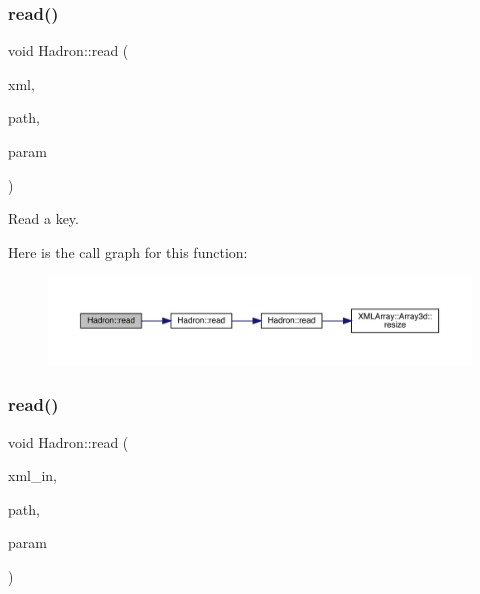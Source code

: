 \subsubsection{\texorpdfstring{read()}{read()}\hspace{0.1cm}{\footnotesize\ttfamily [6/94]}}
{\footnotesize\ttfamily void Hadron\+::read (\begin{DoxyParamCaption}\item[{\mbox{\hyperlink{classADATXML_1_1XMLReader}{X\+M\+L\+Reader}} \&}]{xml,  }\item[{const std\+::string \&}]{path,  }\item[{\mbox{\hyperlink{structHadron_1_1KeyCGCIrrepMom__t}{Key\+C\+G\+C\+Irrep\+Mom\+\_\+t}} \&}]{param }\end{DoxyParamCaption})}



Read a key. 

Here is the call graph for this function\+:
\nopagebreak
\begin{figure}[H]
\begin{center}
\leavevmode
\includegraphics[width=350pt]{d1/daf/namespaceHadron_ab8d127a4d4a1ca38aae1b0d45226789e_cgraph}
\end{center}
\end{figure}
\mbox{\label{namespaceHadron_a9fc0b61edf5216d1720dabf68810d3b5}} 
\subsubsection{\texorpdfstring{read()}{read()}\hspace{0.1cm}{\footnotesize\ttfamily [7/94]}}
{\footnotesize\ttfamily void Hadron\+::read (\begin{DoxyParamCaption}\item[{\mbox{\hyperlink{classADATXML_1_1XMLReader}{X\+M\+L\+Reader}} \&}]{xml\+\_\+in,  }\item[{const std\+::string \&}]{path,  }\item[{\mbox{\hyperlink{structHadron_1_1QuarkNum__t}{Quark\+Num\+\_\+t}} \&}]{param }\end{DoxyParamCaption})}



